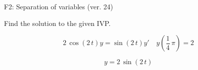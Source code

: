 \begin{exercise}
  \begin{exerciseTitle}F2: Separation of variables (ver. 24)\end{exerciseTitle}
  \begin{exerciseStatement}
    
Find the solution to the given IVP.

    
\[2 \, \cos\left(2 \, t\right) y= \sin\left(2 \, t\right) y'\hspace{1em} y\left( \frac{1}{4} \, \pi \right)= 2\]

  \end{exerciseStatement}
  \begin{exerciseAnswer}
    
\[y= 2 \, \sin\left(2 \, t\right)\]

  \end{exerciseAnswer}
\end{exercise}